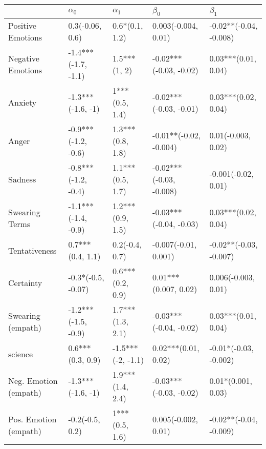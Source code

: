 \begin{tabular}{lllll}
\toprule
{} &           $\alpha_0$ &         $\alpha_1$ &                $\beta_0$ &               $\beta_1$ \\
\midrule
Positive Emotions     &      0.3(-0.06, 0.6) &     0.6*(0.1, 1.2) &      0.003(-0.004, 0.01) &  -0.02**(-0.04, -0.008) \\
Negative Emotions     &  -1.4***(-1.7, -1.1) &       1.5***(1, 2) &   -0.02***(-0.03, -0.02) &     0.03***(0.01, 0.04) \\
Anxiety               &    -1.3***(-1.6, -1) &     1***(0.5, 1.4) &   -0.02***(-0.03, -0.01) &     0.03***(0.02, 0.04) \\
Anger                 &  -0.9***(-1.2, -0.6) &   1.3***(0.8, 1.8) &   -0.01**(-0.02, -0.004) &      0.01(-0.003, 0.02) \\
Sadness               &  -0.8***(-1.2, -0.4) &   1.1***(0.5, 1.7) &  -0.02***(-0.03, -0.008) &     -0.001(-0.02, 0.01) \\
Swearing Terms        &  -1.1***(-1.4, -0.9) &   1.2***(0.9, 1.5) &   -0.03***(-0.04, -0.03) &     0.03***(0.02, 0.04) \\
Tentativeness         &     0.7***(0.4, 1.1) &     0.2(-0.4, 0.7) &     -0.007(-0.01, 0.001) &  -0.02**(-0.03, -0.007) \\
Certainty             &   -0.3*(-0.5, -0.07) &   0.6***(0.2, 0.9) &     0.01***(0.007, 0.02) &     0.006(-0.003, 0.01) \\
Swearing (empath)     &  -1.2***(-1.5, -0.9) &   1.7***(1.3, 2.1) &   -0.03***(-0.04, -0.02) &     0.03***(0.01, 0.04) \\
science               &     0.6***(0.3, 0.9) &  -1.5***(-2, -1.1) &      0.02***(0.01, 0.02) &   -0.01*(-0.03, -0.002) \\
Neg. Emotion (empath) &    -1.3***(-1.6, -1) &   1.9***(1.4, 2.4) &   -0.03***(-0.03, -0.02) &      0.01*(0.001, 0.03) \\
Pos. Emotion (empath) &      -0.2(-0.5, 0.2) &     1***(0.5, 1.6) &      0.005(-0.002, 0.01) &  -0.02**(-0.04, -0.009) \\
\bottomrule
\end{tabular}

